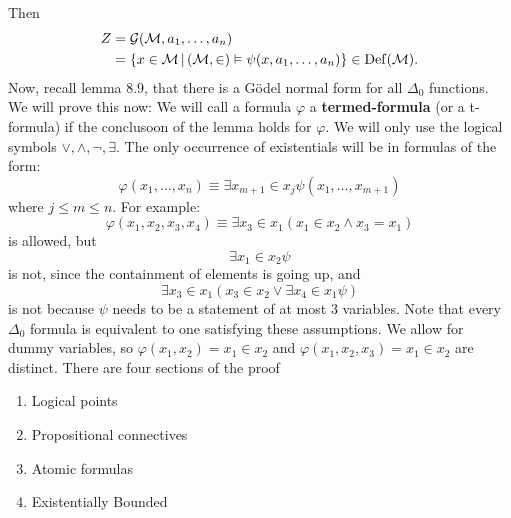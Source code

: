 \documentclass{article}
\begin{document}
Then \begin{align*} Z & = \mathcal{G}(\mathcal{M},a_{1},\dots, a_{n})                                                          \\
                 & = \{ x \in \mathcal{M} \, | \, (\mathcal{M}, \in) \vDash \psi(x,a_{1},\dots,a_{n})\} \in \operatorname{Def}(\mathcal{M}).
\end{align*}
\endproof
Now, recall lemma 8.9, that there is a G\"odel normal form for all $\Delta_{0}$ functions. We will prove this now:
\proof We will call a formula $\varphi$ a \textbf{termed-formula} (or a t-formula) if the conclusoon of the lemma holds for $\varphi$. We will only use the logical symbols $\vee, \wedge, \neg, \exists$. The only occurrence of existentials will be in formulas of the form: \[\varphi(x_{1}, \dots, x_{n}) \equiv \exists x_{m+1} \in x_{j} \psi(x_{1}, \dots, x_{m+1})\] where $j \leq m \leq n$. For example: \[ \varphi(x_{1},x_{2},x_{3},x_{4}) \equiv \exists x_{3} \in x_{1} (x_{1} \in x_{2} \wedge x_{3}=x_{1})\] is allowed, but \[ \exists x_{1} \in x_{2} \psi\] is not, since the containment of elements is going up, and \[ \exists x_{3} \in x_{1} (x_{3} \in x_{2} \vee \exists x_{4} \in x_{1} \psi)\] is not because $\psi$ needs to be a statement of at most $3$ variables.\gap
Note that every $\Delta_{0}$ formula is equivalent to one satisfying these assumptions. We allow for dummy variables, so $\varphi(x_{1},x_{2}) = x_{1} \in x_{2}$ and $\varphi(x_{1},x_{2},x_{3}) = x_{1} \in x_{2}$ are distinct. There are four sections of the proof \begin{enumerate}
    \item Logical points
    \item Propositional connectives
    \item Atomic formulas
    \item Existentially Bounded
\end{enumerate}
\end{document}
